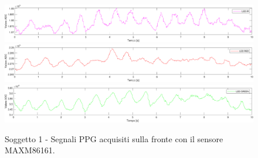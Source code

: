 \begin{figure}[h]
	\centering
	\includegraphics[width=1\linewidth]{ImageFiles/Misure Preliminari/Soggetto 1/MAXM86161/fronte_ired}
	\includegraphics[width=1\linewidth]{ImageFiles/Misure Preliminari/Soggetto 1/MAXM86161/fronte_red}
	\includegraphics[width=1\linewidth]{ImageFiles/Misure Preliminari/Soggetto 1/MAXM86161/fronte_green}
	\caption{Soggetto 1 - Segnali PPG acquisiti sulla fronte con il sensore MAXM86161.}
	\label{fig:soggetto1_MAXM86161_fronte}
\end{figure}




\clearpage